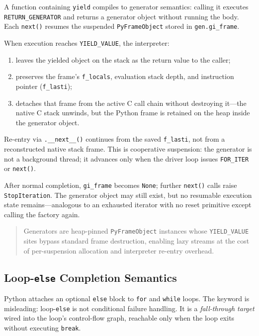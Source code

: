 \documentclass[a4paper,twoside]{report}
\begin{document}
A function containing \texttt{yield} compiles to generator semantics: calling it executes \texttt{RETURN\_GENERATOR} and returns a generator object without running the body. Each \texttt{next()} resumes the suspended \texttt{PyFrameObject} stored in \texttt{gen.gi\_frame}.

When execution reaches \texttt{YIELD\_VALUE}, the interpreter:

\begin{enumerate}
    \item leaves the yielded object on the stack as the return value to the caller;
    \item preserves the frame's \texttt{f\_locals}, evaluation stack depth, and instruction pointer (\texttt{f\_lasti});
    \item detaches that frame from the active C call chain without destroying it---the native C stack unwinds, but the Python frame is retained on the heap inside the generator object.
\end{enumerate}

Re-entry via \texttt{.\_\_next\_\_()} continues from the saved \texttt{f\_lasti}, not from a reconstructed native stack frame. This is cooperative suspension: the generator is not a background thread; it advances only when the driver loop issues \texttt{FOR\_ITER} or \texttt{next()}.

After normal completion, \texttt{gi\_frame} becomes \texttt{None}; further \texttt{next()} calls raise \texttt{StopIteration}. The generator object may still exist, but no resumable execution state remains---analogous to an exhausted iterator with no reset primitive except calling the factory again.

\begin{quote}
Generators are heap-pinned \texttt{PyFrameObject} instances whose \texttt{YIELD\_VALUE} sites bypass standard frame destruction, enabling lazy streams at the cost of per-suspension allocation and interpreter re-entry overhead.
\end{quote}


\subsection{Loop-\texttt{else} Completion Semantics}

Python attaches an optional \texttt{else} block to \texttt{for} and \texttt{while} loops. The keyword is misleading: loop-\texttt{else} is not conditional failure handling. It is a \emph{fall-through target} wired into the loop's control-flow graph, reachable only when the loop exits without executing \texttt{break}.
\end{document}

